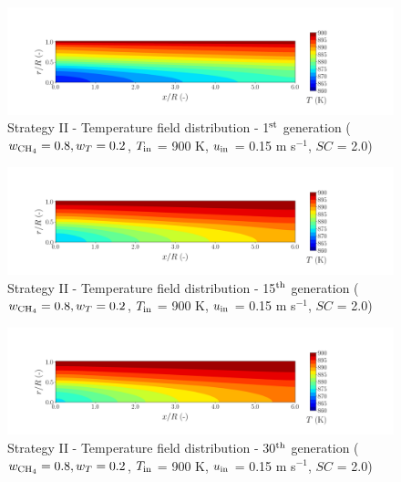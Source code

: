 \documentclass[preprint,12pt]{elsarticle}
\begin{document}
\begin{figure}[h!]
\centering
\includegraphics[width=190mm]{results/5Eq/80C_20T/GEN1-TFIELD.png}
\caption{\label{fig:5RES8020G1-TField} Strategy II - Temperature field distribution - 1$^{\rm{st}}$ generation ($w_{\rm{CH_4}} = 0.8, w_T = 0.2$, $T_{\rm{in}}$ = 900 K, $u_{\rm{in}}$ = 0.15 m s$^{-1}$, $SC$ = 2.0)}
\end{figure}

\begin{figure}[h!]
\centering
\includegraphics[width=190mm]{results/5Eq/80C_20T/GEN15-TFIELD.png}
\caption{\label{fig:5RES8020G15-TField} Strategy II - Temperature field distribution - 15$^{\rm{th}}$ generation ($w_{\rm{CH_4}} = 0.8, w_T = 0.2$, $T_{\rm{in}}$ = 900 K, $u_{\rm{in}}$ = 0.15 m s$^{-1}$, $SC$ = 2.0)}
\end{figure}

\begin{figure}[h!]
\centering
\includegraphics[width=190mm]{results/5Eq/80C_20T/GEN30-TFIELD.png}
\caption{\label{fig:5RES8020G30-TField} Strategy II - Temperature field distribution - 30$^{\rm{th}}$ generation ($w_{\rm{CH_4}} = 0.8, w_T = 0.2$, $T_{\rm{in}}$ = 900 K, $u_{\rm{in}}$ = 0.15 m s$^{-1}$, $SC$ = 2.0)}
\end{figure}
\end{document}
